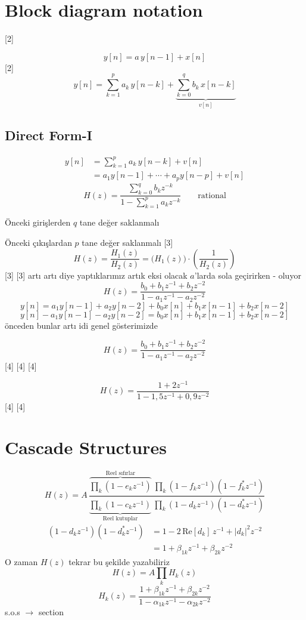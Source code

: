 \documentclass[11pt,a4paper]{article}
\begin{document}
\section{Block diagram notation}
[2]

\[ y[n] = a\,y[n-1] + x[n] \]
[2]
\[ y[n] = \sum_{k=1}^{p} a_k\, y[n-k] + \underbrace{\sum_{k=0}^{q} b_k\, x[n-k]}_{v[n]} \]

\subsection{Direct Form-I}
\begin{align*}
y[n] &= \sum_{k=1}^{p} a_k\, y[n-k] + v[n]\\
&= a_1 y[n-1] + \cdots + a_p y[n-p] + v[n]
\end{align*}
\[ H(z) = \frac{\sum_{k=0}^{q} b_k z^{-k}}{1 - \sum_{k=1}^{p} a_k z^{-k}} \qquad \text{rational} \]

Önceki girişlerden $q$ tane değer saklanmalı

Önceki çıkışlardan $p$ tane değer saklanmalı
[3]
\[ H(z) = \frac{H_1(z)}{H_2(z)} = \big(H_1(z)\big)\cdot\left(\frac{1}{H_2(z)}\right) \]
[3]
[3]
artı artı diye yaptıklarımız artık eksi olacak $a$'larda sola geçirirken - oluyor
\[ H(z) = \frac{b_0 + b_1 z^{-1} + b_2 z^{-2}}{1 - a_1 z^{-1} - a_2 z^{-2}} \]
\[ y[n] = a_1 y[n-1] + a_2 y[n-2] + b_0 x[n] + b_1 x[n-1] + b_2 x[n-2] \]
\[ y[n] - a_1 y[n-1] - a_2 y[n-2] = b_0 x[n] + b_1 x[n-1] + b_2 x[n-2] \]
önceden bunlar artı idi genel gösterimizde

\[ H(z) = \frac{b_0 + b_1 z^{-1} + b_2 z^{-2}}{1 - a_1 z^{-1} - a_2 z^{-2}} \]
[4]
[4]
[4]

\begin{ornek}
\[ H(z) = \frac{1 + 2z^{-1}}{1 - 1{,}5z^{-1} + 0{,}9z^{-2}} \]
[4]
[4]
\end{ornek}

\section{Cascade Structures}
\[ H(z) = A\,\frac{\overbrace{\prod_k (1 - e_k z^{-1})}^{\text{Reel sıfırlar}}\ \prod_k (1 - f_k z^{-1})(1 - f_k^* z^{-1})}{\underbrace{\prod_k (1 - c_k z^{-1})}_{\text{Reel kutuplar}}\ \prod_k (1 - d_k z^{-1})(1 - d_k^* z^{-1})} \]
\begin{align*}
(1 - d_k z^{-1})(1 - d_k^* z^{-1}) &= 1 - 2\,\mathrm{Re}[d_k]\,z^{-1} + |d_k|^2 z^{-2}\\
&= 1 + \beta_{1k} z^{-1} + \beta_{2k} z^{-2}
\end{align*}
O zaman $H(z)$ tekrar bu şekilde yazabiliriz
\[ H(z) = A \prod_k H_k(z) \]
\[ H_k(z) = \frac{1 + \beta_{1k} z^{-1} + \beta_{2k} z^{-2}}{1 - \alpha_{1k} z^{-1} - \alpha_{2k} z^{-2}} \]
s.o.s $\rightarrow$ section
\end{document}
